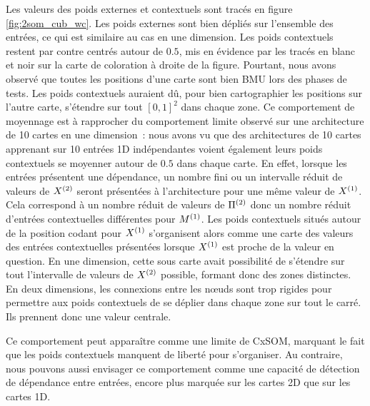\documentclass[../main]{subfiles}
\begin{document}
Les valeurs des poids externes et contextuels sont tracés en figure \ref{fig:2som_cub_wc}.
Les poids externes sont bien dépliés sur l'ensemble des entrées, ce qui est similaire au cas en une dimension.
Les poids contextuels restent par contre centrés autour de $0.5$, mis en évidence par les tracés en blanc et noir sur la carte de coloration à droite de la figure.
Pourtant, nous avons observé que toutes les positions d'une carte sont bien BMU lors des phases de tests. 
Les poids contextuels auraient dû, pour bien cartographier les positions sur l'autre carte, s'étendre sur tout $[0,1]^2$ dans chaque zone.
Ce comportement de moyennage est à rapprocher du comportement limite observé sur une architecture de 10 cartes en une dimension~: nous avons vu que des architectures de 10 cartes apprenant sur 10 entrées 1D indépendantes voient également leurs poids contextuels se moyenner autour de $0.5$ dans chaque carte.
En effet, lorsque les entrées présentent une  dépendance, un nombre fini ou un intervalle réduit de valeurs de $X^{({2})}$ seront présentées à l'architecture pour une même valeur de $X^{({1})}$. Cela correspond à un nombre réduit de valeurs de $\Pi^{({2})}$ donc un nombre réduit d'entrées contextuelles différentes pour $M^{({1})}$. 
Les poids contextuels situés autour de la position codant pour $X^{({1})}$ s'organisent alors comme une carte des valeurs des entrées contextuelles présentées lorsque $X^{({1})}$ est proche de la valeur en question. En une dimension, cette sous carte avait possibilité de s'étendre sur tout l'intervalle de valeurs de $X^{({2})}$ possible, formant donc des zones distinctes.
En deux dimensions, les connexions entre les n\oe{}uds sont trop rigides pour permettre aux poids contextuels de se déplier dans chaque zone sur tout le carré. Ils prennent donc une valeur centrale.

Ce comportement peut apparaître comme une limite de CxSOM, marquant le fait que les poids contextuels manquent de liberté pour s'organiser.
Au contraire, nous pouvons aussi envisager ce comportement comme une capacité de détection de dépendance entre entrées, encore plus marquée sur les cartes 2D que sur les cartes 1D. 
\end{document}
